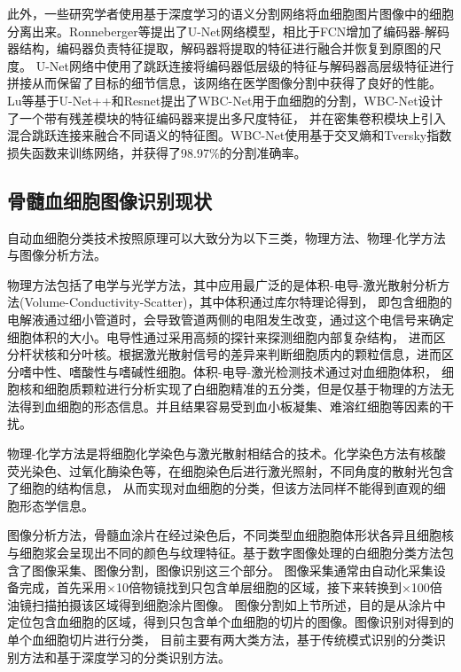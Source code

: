 此外，一些研究学者使用基于深度学习的语义分割网络将血细胞图片图像中的细胞分离出来。Ronneberger\cite{long2015fully}等提出了U-Net网络模型，相比于FCN增加了编码器-解码器结构，编码器负责特征提取，解码器将提取的特征进行融合并恢复到原图的尺度。
U-Net网络中使用了跳跃连接将编码器低层级的特征与解码器高层级特征进行拼接从而保留了目标的细节信息，该网络在医学图像分割中获得了良好的性能。
Lu等\cite{lu2021wbc}基于U-Net++和Resnet提出了WBC-Net用于血细胞的分割，WBC-Net设计了一个带有残差模块的特征编码器来提出多尺度特征，
并在密集卷积模块上引入混合跳跃连接来融合不同语义的特征图。WBC-Net使用基于交叉熵和Tversky指数损失函数来训练网络，并获得了98.97\%的分割准确率。
\subsection{骨髓血细胞图像识别现状}
自动血细胞分类技术按照原理可以大致分为以下三类，物理方法、物理-化学方法与图像分析方法\cite{wubai2011}。

物理方法包括了电学与光学方法，其中应用最广泛的是体积-电导-激光散射分析方法(Volume-Conductivity-Scatter)，其中体积通过库尔特理论得到，
即包含细胞的电解液通过细小管道时，会导致管道两侧的电阻发生改变，通过这个电信号来确定细胞体积的大小。电导性通过采用高频的探针来探测细胞内部复杂结构，
进而区分杆状核和分叶核。根据激光散射信号的差异来判断细胞质内的颗粒信息，进而区分嗜中性、嗜酸性与嗜碱性细胞。体积-电导-激光检测技术通过对血细胞体积，
细胞核和细胞质颗粒进行分析实现了白细胞精准的五分类，但是仅基于物理的方法无法得到血细胞的形态信息。并且结果容易受到血小板凝集、难溶红细胞等因素的干扰。

物理-化学方法是将细胞化学染色与激光散射相结合的技术。化学染色方法有核酸荧光染色、过氧化酶染色等，在细胞染色后进行激光照射，不同角度的散射光包含了细胞的结构信息，
从而实现对血细胞的分类，但该方法同样不能得到直观的细胞形态学信息。

图像分析方法，骨髓血涂片在经过染色后，不同类型血细胞胞体形状各异且细胞核与细胞浆会呈现出不同的颜色与纹理特征。基于数字图像处理的白细胞分类方法包含了图像采集、图像分割，图像识别这三个部分。
图像采集通常由自动化采集设备完成，首先采用×10倍物镜找到只包含单层细胞的区域，接下来转换到×100倍油镜扫描拍摄该区域得到细胞涂片图像。
图像分割如上节所述，目的是从涂片中定位包含血细胞的区域，得到只包含单个血细胞的切片的图像。图像识别对得到的单个血细胞切片进行分类，
目前主要有两大类方法，基于传统模式识别的分类识别方法和基于深度学习的分类识别方法。

